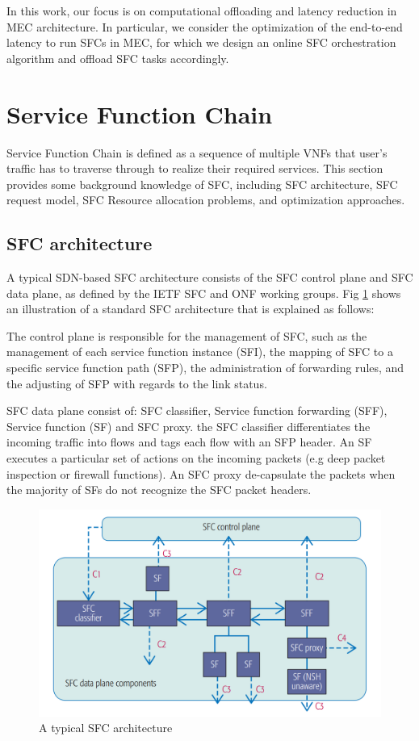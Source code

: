 In this work, our focus is on computational offloading and latency reduction in MEC architecture. In particular, we consider the optimization of the end-to-end latency to run SFCs in MEC, for which we design an online SFC orchestration algorithm and offload SFC tasks accordingly.







\section{Service Function Chain}
\label{sec: SFC}
Service Function Chain is defined as a sequence of multiple VNFs that user's traffic has to traverse through to realize their required services. This section provides some background knowledge of SFC, including SFC architecture, SFC request model,  SFC Resource allocation problems, and optimization approaches.
\subsection{SFC architecture}
A typical SDN-based SFC architecture consists of the SFC control plane and  SFC data plane, as defined by the IETF SFC and ONF working groups. Fig \ref{fig:SFCachitecture} shows an illustration of a standard SFC architecture that is explained as follows:

 The control plane is responsible for the management of SFC, such as the management of each service function instance (SFI), the mapping of SFC to a specific service function path (SFP), the administration of forwarding rules, and the adjusting of SFP with regards to the link status.

 SFC data plane consist of: SFC classifier, Service function forwarding (SFF), Service function (SF) and SFC proxy. the SFC classifier differentiates the incoming traffic into flows and tags each flow with an SFP header. An SF executes a particular set of actions on the incoming packets (e.g deep packet inspection or firewall functions). An SFC proxy de-capsulate the packets when the majority of SFs do not recognize the SFC packet headers.
\begin{figure}
	\centering
	\includegraphics[width=0.9\linewidth]{figs/SFCarchitecture.PNG}
		\vspace{\baselineskip}
	\caption{A typical SFC architecture \cite{medhat2016service}}
	\label{fig:SFCachitecture}
\end{figure}

